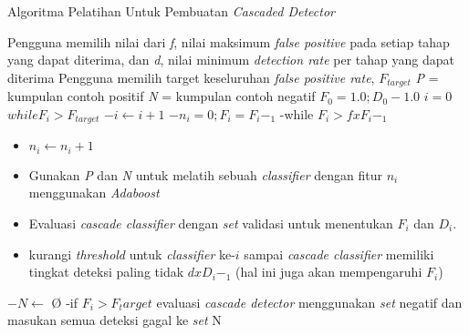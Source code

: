 \begin{algorithm}
  \caption{Algoritma Pelatihan Untuk Pembuatan \textit{Cascaded Detector}}
  \begin{algorithmic} [1]
    \State Pengguna memilih nilai dari \textit{f}, nilai maksimum \emph{false positive} 
    pada setiap tahap yang dapat diterima, dan \textit{d}, nilai minimum \emph{detection rate} 
    per tahap yang dapat diterima
    \State Pengguna memilih target keseluruhan \emph{false positive rate}, $F_{target}$
    \State \textit{P} = kumpulan contoh positif
    \State \textit{N} = kumpulan contoh negatif
    \State $F_0 = 1.0; D_0 - 1.0$
    \State $i = 0$
    \State $while F_i > F_{target}$
    \Statex $-i \leftarrow i + 1$
    \Statex $-n_i = 0; F_i = F_i-_1$
    \Statex -while $F_i > f x F_i-_1$
    \begin{itemize}
      \item $n_i \leftarrow n_i + 1$
      \item Gunakan \textit{P} dan \textit{N} untuk melatih sebuah \emph{classifier}
      dengan fitur $n_i$ menggunakan \emph{Adaboost} 
      \item Evaluasi \emph{cascade classifier} dengan \textit{set} validasi
      untuk menentukan $F_i$ dan $D_i$. 
      \item kurangi \textit{threshold} untuk \emph{classifier} ke-$i$ sampai 
      \emph{cascade classifier} memiliki tingkat deteksi paling tidak $d x D_i-_1$ 
      (hal ini juga akan mempengaruhi $F_i$)
    \end{itemize}
    \Statex $-N \leftarrow$ {\O}
    \Statex -if $F_i > F_target$ evaluasi \emph{cascade detector} menggunakan 
    \textit{set} negatif dan masukan semua deteksi gagal ke \textit{set} N
  \end{algorithmic}
\end{algorithm}


